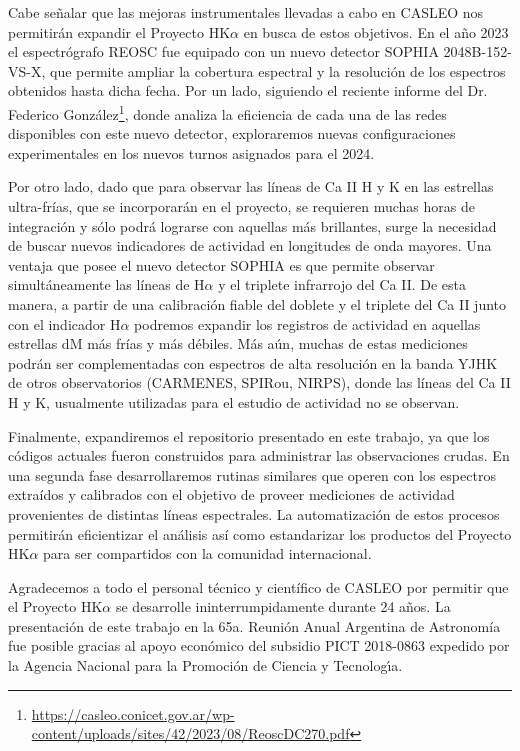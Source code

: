 \documentclass[baaa]{baaa}
\begin{document}
Cabe señalar que las mejoras instrumentales llevadas a cabo en CASLEO nos permitirán expandir el Proyecto HK$\alpha$ en busca de estos objetivos.
En el año 2023 el espectrógrafo REOSC fue equipado con un nuevo detector SOPHIA 2048B-152-VS-X, que permite ampliar la cobertura espectral y la resolución de los espectros obtenidos hasta dicha fecha. Por un lado, siguiendo el reciente  informe del Dr. Federico González\footnote{\url{https://casleo.conicet.gov.ar/wp-content/uploads/sites/42/2023/08/ReoscDC270.pdf}}, donde analiza la eficiencia de cada una de las redes disponibles con este nuevo detector, exploraremos nuevas configuraciones experimentales en los nuevos turnos asignados para el 2024. 

Por otro lado, dado que para observar las líneas de Ca  \scriptsize{II}\normalsize\- H y K en las estrellas ultra-frías, que se incorporarán en el proyecto, se requieren muchas horas de integración y sólo podrá lograrse con aquellas más brillantes, surge la necesidad de buscar nuevos indicadores de actividad en longitudes de onda mayores. Una ventaja que posee el nuevo detector  SOPHIA es que permite observar simultáneamente las líneas de H$\alpha$ y el triplete infrarrojo del Ca \scriptsize{II}\normalsize. De esta manera, a partir de una calibración fiable del doblete y el triplete del Ca \scriptsize{II}\normalsize\- junto con el indicador H$\alpha$ podremos expandir los registros de actividad en aquellas estrellas dM más frías y más débiles. Más aún, muchas de estas mediciones podrán ser complementadas con  espectros de alta resolución en la banda YJHK de otros observatorios (CARMENES, SPIRou, NIRPS), donde las líneas del Ca \scriptsize{II}\normalsize\- H y K, usualmente utilizadas para el estudio de actividad no se observan.

Finalmente, expandiremos el repositorio presentado en este trabajo, ya que los códigos actuales fueron construidos para administrar las observaciones crudas. En una segunda fase desarrollaremos  rutinas similares  que operen con los espectros extraídos y calibrados con el objetivo de proveer mediciones de actividad provenientes de distintas líneas espectrales. La automatización de estos procesos permitirán eficientizar el análisis así como estandarizar los productos del Proyecto HK$\alpha$ para ser compartidos con la comunidad internacional. 
\begin{acknowledgement}
Agradecemos a todo el personal técnico y científico de CASLEO por permitir que el Proyecto HK$\alpha$ se desarrolle ininterrumpidamente durante 24 años. La presentación de este trabajo en la 65a. Reunión Anual Argentina de Astronomía fue posible gracias al apoyo económico del subsidio PICT 2018-0863 expedido por la Agencia Nacional para la Promoci\'on de Ciencia y
Tecnolog\'\i a.
\end{acknowledgement}
\end{document}
